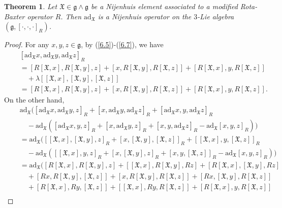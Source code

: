 \documentclass[10pt,a4paper]{amsart}
\newtheorem{theorem}{Theorem}
\begin{document}
 \begin{theorem}
Let $\mathfrak{X}\in \mathfrak{g}\wedge \mathfrak{g}$  be a Nijenhuis element associated to a modified Rota-Baxter operator $R$. Then $\mathrm{ad}_\mathfrak{X}$ is a
 Nijenhuis operator on the $3$-Lie algebra $(\mathfrak{g}, [\cdot, \cdot, \cdot]_R)$.
\end{theorem}

\begin{proof}
For any $x, y,z \in \mathfrak{g}$, by (\ref{6.5})-(\ref{6.7}), we have
\begin{align*}
&[\mathrm{ad}_\mathfrak{X}x, \mathrm{ad}_\mathfrak{X}y, \mathrm{ad}_\mathfrak{X}z]_R\\
&=[R[\mathfrak{X}, x], R[\mathfrak{X}, y], z]+[x, R[\mathfrak{X}, y], R[\mathfrak{X}, z]]+[R[\mathfrak{X}, x], y, R[\mathfrak{X}, z]]\\
\quad&\quad+\lambda[[\mathfrak{X}, x], [\mathfrak{X}, y], [\mathfrak{X}, z]]\\
&=[R[\mathfrak{X}, x], R[\mathfrak{X}, y], z]+[x, R[\mathfrak{X}, y], R[\mathfrak{X}, z]]+[R[\mathfrak{X}, x], y, R[\mathfrak{X}, z]].
\end{align*}
On the other hand,
\begin{align*}
&\mathrm{ad}_\mathfrak{X}\big( [\mathrm{ad}_\mathfrak{X}x, \mathrm{ad}_\mathfrak{X}y, z]_R+[x, \mathrm{ad}_\mathfrak{X}y, \mathrm{ad}_\mathfrak{X}z]_R+[\mathrm{ad}_\mathfrak{X}x, y, \mathrm{ad}_\mathfrak{X}z]_R\\
\quad & \quad -\mathrm{ad}_\mathfrak{X}([\mathrm{ad}_\mathfrak{X}x, y, z]_R+[x, \mathrm{ad}_\mathfrak{X}y, z]_R+[x, y, \mathrm{ad}_\mathfrak{X}z]_R-\mathrm{ad}_\mathfrak{X}[x, y, z]_R)\big)\\
\quad&=\mathrm{ad}_\mathfrak{X}\Big( [[\mathfrak{X}, x], [\mathfrak{X}, y], z]_R+[x, [\mathfrak{X}, y], [\mathfrak{X}, z]]_R+[[\mathfrak{X}, x], y, [\mathfrak{X}, z]]_R\\
\quad&\quad -\mathrm{ad}_\mathfrak{X}([[\mathfrak{X}, x], y, z]_R+[x, [\mathfrak{X}, y], z]_R+[x, y, [\mathfrak{X}, z]]_R-\mathrm{ad}_\mathfrak{X}[x, y, z]_R)\Big)\\
&=\mathrm{ad}_\mathfrak{X}\Big( [R[\mathfrak{X}, x], R[\mathfrak{X}, y], z]+[[\mathfrak{X}, x], R[\mathfrak{X}, y], Rz]+[R[\mathfrak{X}, x], [\mathfrak{X}, y], Rz]\\
\quad&\quad+[Rx, R[\mathfrak{X}, y], [\mathfrak{X}, z]]+[x, R[\mathfrak{X}, y], R[\mathfrak{X}, z]]+[Rx, [\mathfrak{X}, y], R[\mathfrak{X}, z]]\\
\quad&\quad+[R[\mathfrak{X}, x], Ry, [\mathfrak{X}, z]]+[[\mathfrak{X}, x], Ry, R[\mathfrak{X}, z]]+[R[\mathfrak{X}, x], y, R[\mathfrak{X}, z]]\\

\end{align*}
\end{proof}
\end{document}
